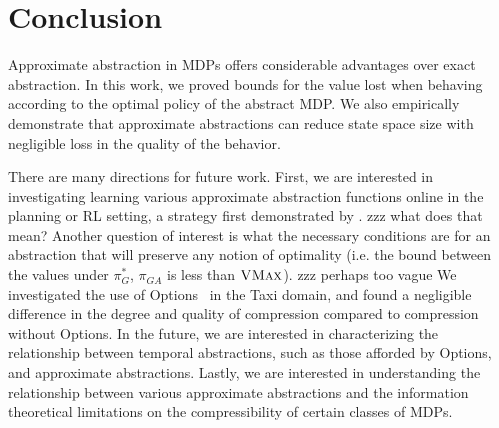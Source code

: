 \section{Conclusion}

Approximate abstraction in \acp{MDP} offers considerable advantages over exact abstraction. In this work, we proved bounds for the value lost when behaving according to the optimal policy of the abstract \ac{MDP}. We also empirically demonstrate that approximate abstractions can reduce state space size with negligible loss in the quality of the behavior.


There are many directions for future work.
First, we are interested in investigating learning various approximate abstraction functions online in the planning or \ac{RL} setting, a strategy first demonstrated by \citeauthor{ortner2013adaptive}.
zzz what does that mean?
Another question of interest is what the necessary conditions are for an abstraction that will preserve any notion of optimality (i.e. the bound between the values under $\pi_G^*$, $\pi_{GA}$ is less than $\textsc{VMax}$).
zzz perhaps too vague
We investigated the use of Options~\cite{sutton1999between} in the Taxi domain, and found a negligible difference in the degree and quality of compression compared to compression without Options. In the future, we are interested in characterizing the relationship between temporal abstractions, such as those afforded by Options, and approximate abstractions.
Lastly, we are interested in understanding the relationship between various approximate abstractions and the information theoretical limitations on the compressibility of certain classes of \acp{MDP}.

